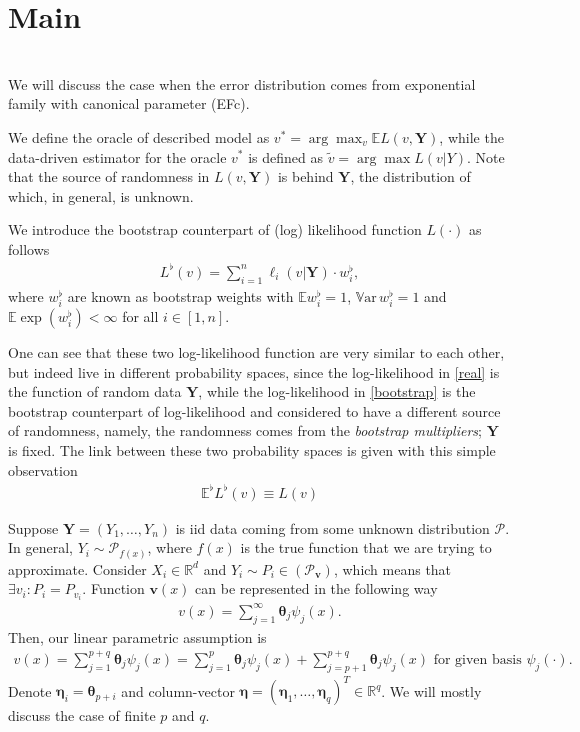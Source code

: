 \documentclass[12pt]{article}
\renewcommand{\v}[1]{\ensuremath{\mathbf{#1}}} %
\renewcommand{\=}[1]{\stackrel{#1}{=}} %
\begin{document}
\section{Main}
{\color{blue}{bad structure}}
\\
We will discuss the case when the error distribution comes from exponential family with canonical parameter (EFc). 
\par We define the oracle of described model as $v^* = \arg\max_{v} \mathbb{E} L(v, \mathbf{Y})$, while the data-driven estimator for the oracle $v^*$ is defined as $\tilde{v} = \arg\max L (v | Y)$. Note that the source of randomness in $L(v, \mathbf{Y})$ is behind $\mathbf{Y}$, the distribution of which, in general, is unknown. 
\par We introduce the bootstrap counterpart of (log) likelihood function $L(\cdot)$ as follows 
\begin{align}\label{bootstrap}
L^{\flat}(v) = \sum_{i=1}^n \ell_i(v | \mathbf{Y}) \cdot w_i^{\flat}, 
\end{align}
where $w_i^{\flat}$ are known as bootstrap weights with $\mathbb{E} w_i^{\flat} = 1$,  $\mathbb{V}\text{ar} \, w_i^{\flat} = 1$ and $\mathbb{E} \exp(w_i^{\flat}) < \infty$ for all $i \in [1, n]$. \par One can see that these two log-likelihood function are very similar to each other, but indeed live in different probability spaces, since the log-likelihood in \eqref{real} is the function of random data $\mathbf{Y}$, while the log-likelihood in \eqref{bootstrap} is the bootstrap counterpart of log-likelihood and considered to have a different source of randomness, namely, the randomness comes from the {\it{bootstrap multipliers}}; $\mathbf{Y}$ is fixed. The link between these two probability spaces is given with this simple observation 
\begin{align}
\mathbb{E}^{\flat} L^{\flat}(v) \equiv L(v)
\end{align}
\par Suppose $\mathbf{Y} = (Y_1, \dots, Y_n)$ is iid data coming from some unknown distribution $\mathcal{P}$. In general, $Y_i \sim \mathcal{P}_{f(x)}$, where $f(x)$ is the true function that we are trying to approximate. Consider $X_i \in \mathbb{R}^d$ and $Y_i \sim P_i \in (\mathcal{P}_{\v{v}})$, which means that $\exists v_i : P_i = P_{v_i}$. Function $\v{v}(x)$ can be represented in the following way
\begin{eqnarray*}
v(x) = \sum_{j=1}^{\infty} {\v{\theta}}_j \psi_j(x).
\end{eqnarray*}
Then, our linear parametric assumption is
\begin{eqnarray}
v(x) = \sum_{j=1}^{p+q} {\v{\theta}}_j \psi_j(x) = \sum_{j=1}^p {\v{\theta}}_j \psi_{j}(x) + \sum_{j= p+1}^{p+q} {\v{\theta}}_j \psi_{j}(x) \text{ for given basis $\psi_j(\cdot)$}.
\end{eqnarray}
Denote ${\v{\eta}}_{i} = {\v{\theta}}_{p + i}$ and column-vector ${\v{\eta}} = ({\v{\eta}}_1, \dots, {\v{\eta}}_{q})^T \in \mathbb{R}^q$.
We will mostly discuss the case of finite $p$ and $q$.
\end{document}
